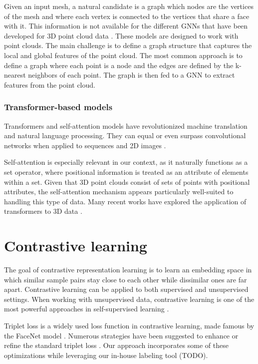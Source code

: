 Given an input mesh, a natural candidate is a graph which nodes are the vertices of the mesh and where each vertex is connected to the vertices that share a face with it. This information is not available for the different GNNs that have been developed for 3D point cloud data \cite{vermaFeaStNetFeatureSteeredGraph2018,wangDynamicGraphCNN2019,dengPPFNetGlobalContext2018}. These models are designed to work with point clouds. The main challenge is to define a graph structure that captures the local and global features of the point cloud. The most common approach is to define a graph where each point is a node and the edges are defined by the k-nearest neighbors of each point. The graph is then fed to a GNN to extract features from the point cloud.

\subsubsection{Transformer-based models}

Transformers \cite{vaswaniAttentionAllYou2023b} and self-attention models have revolutionized machine translation and natural language processing. 
They can equal or even surpass convolutional networks when applied to sequences and 2D images \cite{dosovitskiyImageWorth16x162021}. 

Self-attention is especially relevant in our context, as it naturally functions as a set operator, where positional information is treated as an attribute of elements within a set. Given that 3D point clouds consist of sets of points with positional attributes, the self-attention mechanism appears particularly well-suited to handling this type of data. Many recent works have explored the application of transformers to 3D data \cite{zhaoPointTransformer2021,yuPointBERTPretraining3D2022,liuOpenShapeScaling3D2023}.

\section{Contrastive learning}

The goal of contrastive representation learning is to learn an embedding space in which similar sample pairs stay close to each other while dissimilar ones are far apart. Contrastive learning can be applied to both supervised and unsupervised settings. When working with unsupervised data, contrastive learning is one of the most powerful approaches in self-supervised learning \cite{wengContrastiveRepresentationLearning2021}.


Triplet loss is a widely used loss function in contrastive learning, made famous by the FaceNet model \cite{schroffFaceNetUnifiedEmbedding2015}. Numerous strategies have been suggested to enhance or refine the standard triplet loss \cite{hermansDefenseTripletLoss2017,geDeepMetricLearning2018,sundriyalSemiSupervisedLearningTriplet2021}. Our approach incorporates some of these optimizations while leveraging our in-house labeling tool (TODO).

